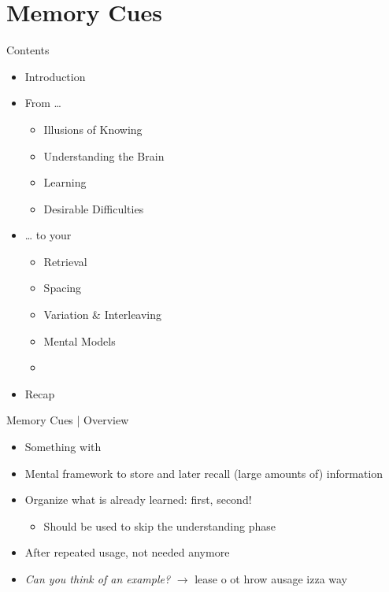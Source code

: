 \documentclass{ercisbeamer}
\begin{document}
\section{Memory Cues}
\begin{frame}{Contents}
    \begin{itemize}
        \item Introduction
        \item From …
        \begin{itemize}
            \item Illusions of Knowing
            \item Understanding the Brain
            \item Learning
            \item Desirable Difficulties
        \end{itemize}
        \item … to your 
        \begin{itemize}
            \item Retrieval
            \item Spacing
            \item Variation \& Interleaving
            \item Mental Models
            \item {}
        \end{itemize}
        \item Recap
    \end{itemize}
\end{frame}

\begin{frame}{Memory Cues | Overview}
    \begin{tbox}
        \begin{itemize}
            \item Something with 
            \item Mental framework to store and later recall (large amounts of) information
            \item Organize what is already learned:  first,  second!
            \begin{itemize}
                \item Should  be used to skip the understanding phase
            \end{itemize} 
            \item After repeated usage, not needed anymore
            \item \emph{Can you think of an example?} \pause
            $\rightarrow$ lease o ot hrow ausage izza way 
        \end{itemize}
    \end{tbox}
\end{frame}
\setbgimage{}
\end{document}
